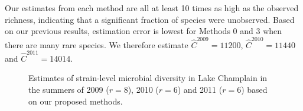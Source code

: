 \documentclass[12pt]{article}
\theoremstyle{break}
\theoremstyle{break}
\begin{document}
Our estimates from each method are all at least 10 times as high as the observed richness, indicating that a significant fraction of species were unobserved. Based on our previous results, estimation error is lowest for Methods 0 and 3 when there are many rare species. We therefore estimate $\widehat{C}^{2009} = 11200$, $\widehat{C}^{2010} = 11440$ and $\widehat{C}^{2011} = 14014$.


\begin{figure}[t]
\caption{Estimates of strain-level microbial diversity in Lake Champlain in the summers of 2009 ($r = 8$), 2010 ($r = 6$) and 2011 ($r = 6$) based on our proposed methods.
%
\label{fig:data_analysis}}
\centering{}
\end{figure}
\end{document}
